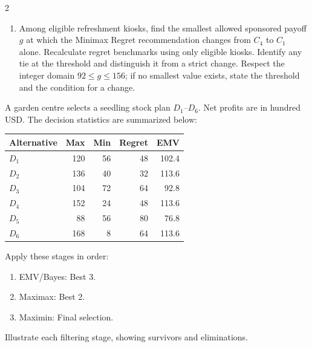 \begin{multicols}{2}
\begin{enumerate}[label=\textbf{(\alph*)},leftmargin=*]
	\item Among eligible refreshment kiosks, find the smallest allowed sponsored payoff $g$ at which the Minimax Regret recommendation changes from $C_4$ to $C_1$ alone. Recalculate regret benchmarks using only eligible kiosks. Identify any tie at the threshold and distinguish it from a strict change. Respect the integer domain $92\leq g\leq156$; if no smallest value exists, state the threshold and the condition for a change. 
\end{enumerate}


\columnbreak
{}
A garden centre selects a seedling stock plan $D_1$--$D_6$. Net profits are in hundred USD. The decision statistics are summarized below:

\vspace{-3mm}
\begin{center}\small\setlength{\tabcolsep}{4pt}
	\begin{tabular}{lrrrr}\toprule
		Alternative & Max & Min & Regret & EMV\\ \midrule
		$D_1$ & 120 & 56 & 48 & 102.4\\
		$D_2$ & 136 & 40 & 32 & 113.6\\
		$D_3$ & 104 & 72 & 64 & 92.8\\
		$D_4$ & 152 & 24 & 48 & 113.6\\
		$D_5$ & 88 & 56 & 80 & 76.8\\
		$D_6$ & 168 & 8 & 64 & 113.6\\
		\bottomrule
	\end{tabular}
\end{center}
\vspace{-3mm}

Apply these stages in order:
\begin{enumerate}[leftmargin=*]
	\item EMV/Bayes: Best 3.
	\item Maximax: Best 2.
	\item Maximin: Final selection.
\end{enumerate}
Illustrate each filtering stage, showing survivors and eliminations.


\end{multicols}
\newpage
